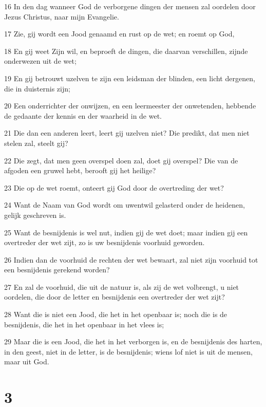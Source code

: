 \par 16 In den dag wanneer God de verborgene dingen der mensen zal oordelen door Jezus Christus, naar mijn Evangelie.
\par 17 Zie, gij wordt een Jood genaamd en rust op de wet; en roemt op God,
\par 18 En gij weet Zijn wil, en beproeft de dingen, die daarvan verschillen, zijnde onderwezen uit de wet;
\par 19 En gij betrouwt uzelven te zijn een leidsman der blinden, een licht dergenen, die in duisternis zijn;
\par 20 Een onderrichter der onwijzen, en een leermeester der onwetenden, hebbende de gedaante der kennis en der waarheid in de wet.
\par 21 Die dan een anderen leert, leert gij uzelven niet? Die predikt, dat men niet stelen zal, steelt gij?
\par 22 Die zegt, dat men geen overspel doen zal, doet gij overspel? Die van de afgoden een gruwel hebt, berooft gij het heilige?
\par 23 Die op de wet roemt, onteert gij God door de overtreding der wet?
\par 24 Want de Naam van God wordt om uwentwil gelasterd onder de heidenen, gelijk geschreven is.
\par 25 Want de besnijdenis is wel nut, indien gij de wet doet; maar indien gij een overtreder der wet zijt, zo is uw besnijdenis voorhuid geworden.
\par 26 Indien dan de voorhuid de rechten der wet bewaart, zal niet zijn voorhuid tot een besnijdenis gerekend worden?
\par 27 En zal de voorhuid, die uit de natuur is, als zij de wet volbrengt, u niet oordelen, die door de letter en besnijdenis een overtreder der wet zijt?
\par 28 Want die is niet een Jood, die het in het openbaar is; noch die is de besnijdenis, die het in het openbaar in het vlees is;
\par 29 Maar die is een Jood, die het in het verborgen is, en de besnijdenis des harten, in den geest, niet in de letter, is de besnijdenis; wiens lof niet is uit de mensen, maar uit God.

\chapter{3}

